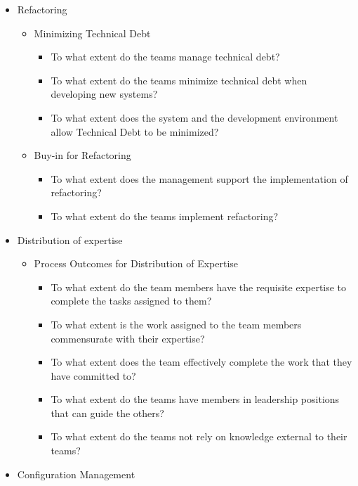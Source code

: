 \begin{appendices}
\begin{itemize}
	\item Refactoring 
		\begin{itemize}
			\item Minimizing Technical Debt 
				\begin{itemize}
					\item To what extent do the teams manage technical debt? 
					\item To what extent do the teams minimize technical debt when developing new systems? 
					\item To what extent does the system and the development environment allow Technical Debt to be minimized? 
				\end{itemize}
			\item Buy-in for Refactoring 
				\begin{itemize}
					\item To what extent does the management support the implementation of refactoring? 
					\item To what extent do the teams implement refactoring? 
				\end{itemize}
		\end{itemize}
	\item Distribution of expertise 
		\begin{itemize}
			\item Process Outcomes for Distribution of Expertise
				\begin{itemize}
					\item To what extent do the team members have the requisite expertise to complete the tasks assigned to them? 
					\item To what extent is the work assigned to the team members commensurate with their expertise? 
					\item To what extent does the team effectively complete the work that they have committed to? 
					\item To what extent do the teams have members in leadership positions that can guide the others? 
					\item To what extent do the teams not rely on knowledge external to their teams? 
				\end{itemize}
		\end{itemize}
	\item Configuration Management
		\begin{itemize}

\end{itemize}
\end{itemize}
\end{appendices}

